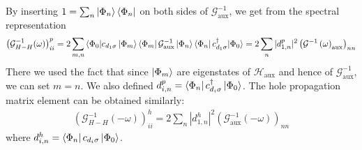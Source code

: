 \documentclass[10pt]{report}
\numberwithin{equation}{section}
\begin{document}
By inserting \(1 = \sum_n \ket{\Phi_n}\bra{\Phi_n}\) on both sides of \(\mathcal{G}^{-1}_\text{aux}\), we get from the spectral representation
\begin{equation}\begin{aligned}
	\left(\mathcal{G}^{-1}_{H-H}(\omega)\right)^p_{ii} = 2\sum_{m,n} \braket{\Phi_0 | c_{d_1\sigma} \ket{\Phi_m}\bra{\Phi_m}\mathcal{G}^{-1}_\text{aux} \ket{\Phi_n}\bra{\Phi_n} c^\dagger_{d_1\sigma} | \Phi_0} = 2\sum_{n} |d^p_{1,n}|^2 \left(\mathcal{G}^{-1}\left(\omega\right) _\text{aux}\right)_{nn}
\end{aligned}\end{equation}
There we used the fact that since \(\ket{\Phi_m}\) are eigenstates of \(\mathcal{H}_\text{aux}\) and hence of \(\mathcal{G}^{-1}_\text{aux}\), we can set \(m=n\). We also defined \(d^p_{i,n} = \bra{\Phi_n}c^\dagger_{d_i\sigma}\ket{\Phi_0}\). The hole propagation matrix element can be obtained similarly:
\begin{equation}\begin{aligned}
	\left(\mathcal{G}^{-1}_{H-H}(-\omega)\right)^h_{ii} = 2\sum_{n} |d^h_{1,n}|^2 \left(\mathcal{G}^{-1}_\text{aux}(-\omega)\right)_{nn} 
\end{aligned}\end{equation}
where \(d^h_{i,n} = \bra{\Phi_n}c_{d_i\sigma}\ket{\Phi_0}\).
\end{document}
